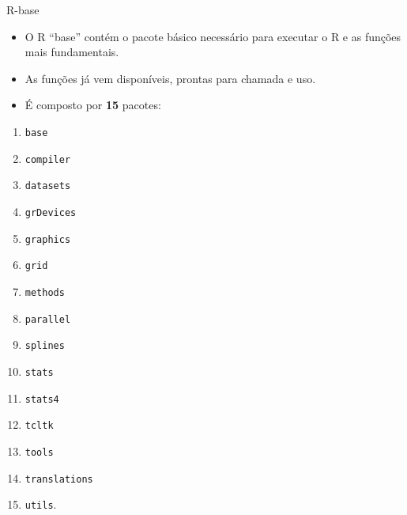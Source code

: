 \documentclass[
  ignorenonframetext,
  serif,
  professionalfont,
  usenames,
  dvipsnames,
  aspectratio = 169]{beamer}
\providecommand{\tightlist}{%
  \setlength{\itemsep}{0pt}\setlength{\parskip}{0pt}}
\renewcommand{\tightlist}{%
  \setlength{\itemsep}{0\baselineskip}
  \setlength{\parskip}{0.25\baselineskip}
}
\def\beginAHalfColumn{\begin{minipage}{0.49\textwidth}}%
\def\endColumns{\end{minipage}}%
\begin{document}
\begin{frame}[fragile]{R-base}
\protect\hypertarget{r-base}{}
\begin{itemize}
\item
  O R ``base'' contém o pacote básico necessário para executar o R e as
  funções mais fundamentais.
\item
  As funções já vem disponíveis, prontas para chamada e uso.
\item
  É composto por \textbf{15} pacotes:
\end{itemize}

\beginAHalfColumn

\begin{enumerate}
\tightlist
\item
  \texttt{base}
\item
  \texttt{compiler}
\item
  \texttt{datasets}
\item
  \texttt{grDevices}
\item
  \texttt{graphics}
\item
  \texttt{grid}
\item
  \texttt{methods}
\item
  \texttt{parallel}
\end{enumerate}

\endColumns
\beginAHalfColumn

\begin{enumerate}
\setcounter{enumi}{8}
\tightlist
\item
  \texttt{splines}
\item
  \texttt{stats}
\item
  \texttt{stats4}
\item
  \texttt{tcltk}
\item
  \texttt{tools}
\item
  \texttt{translations}
\item
  \texttt{utils}.
\end{enumerate}

\endColumns
\end{frame}
\end{document}
